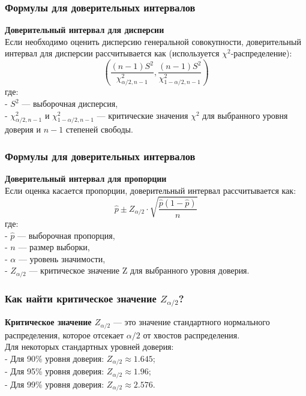 \documentclass[aspectratio=169]{beamer}
\begin{document}
\begin{frame}
\frametitle{Формулы для доверительных интервалов}
{\bf Доверительный интервал для дисперсии}\\
Если необходимо оценить дисперсию генеральной совокупности, доверительный интервал для дисперсии рассчитывается как (используется $\chi^2$-распределение):
\[
\left( \frac{(n-1)S^2}{\chi^2_{\alpha/2, n-1}}, \frac{(n-1)S^2}{\chi^2_{1-\alpha/2, n-1}} \right)
\]
где:\\
- \( S^2 \) — выборочная дисперсия,\\
- \( \chi^2_{\alpha/2, n-1} \) и \( \chi^2_{1-\alpha/2, n-1} \) — критические значения \(\chi^2\) для выбранного уровня доверия и \( n-1 \) степеней свободы.
\end{frame}

\begin{frame}
\frametitle{Формулы для доверительных интервалов}
{\bf Доверительный интервал для пропорции}\\
Если оценка касается пропорции, доверительный интервал рассчитывается как:
\[
\hat{p} \pm Z_{\alpha/2} \cdot \sqrt{\frac{\hat{p}(1 - \hat{p})}{n}}
\]
где:\\
- \( \hat{p} \) — выборочная пропорция,\\
- \(n\) — размер выборки,\\
- \(\alpha\) — уровень значимости,\\
- \( Z_{\alpha/2} \) — критическое значение Z для выбранного уровня доверия.
\end{frame}

\begin{frame}
\frametitle{Как найти критическое значение \(Z_{\alpha/2}\)?}
{\bf Критическое значение \(Z_{\alpha/2}\)} — это значение стандартного нормального распределения, которое отсекает \(\alpha/2\) от хвостов распределения.
\newline\\
Для некоторых стандартных уровней доверия:\\
- Для 90\% уровня доверия: \(Z_{\alpha/2} \approx 1.645\);\\
- Для 95\% уровня доверия: \(Z_{\alpha/2} \approx 1.96\);\\
- Для 99\% уровня доверия: \(Z_{\alpha/2} \approx 2.576\).
\end{frame}
\end{document}
